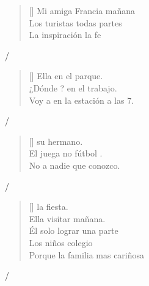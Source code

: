 \documentclass[grid,avery5371]{flashcards}
\begin{document}
\begin{flashcard}{%
\begin{verse}[\versewidth]
Mi amiga  Francia mañana\\
Los turistas  todas partes \\
La inspiración  la fe
\end{verse}
}
  /    
\end{flashcard}

\begin{flashcard}{%
\begin{verse}[\versewidth]
Ella  en el parque.\\
¿Dónde ?  en el trabajo. \\
Voy a  en la estación a las 7. \\
\end{verse}
}
  /    
\end{flashcard}


\begin{flashcard}{%
\begin{verse}[\versewidth]
 su hermano.\\
El juega no  fútbol .\\
No  a nadie que conozco.
\end{verse}
}
  /    
\end{flashcard}

\begin{flashcard}{%
\begin{verse}[\versewidth]
 la fiesta.  \\ 
Ella  visitar mañana.\\
Él solo  lograr una parte \\
Los niños  colegio \\
Porque  la familia mas cariñosa
\end{verse}
}
  /    
\end{flashcard}
\end{document}
